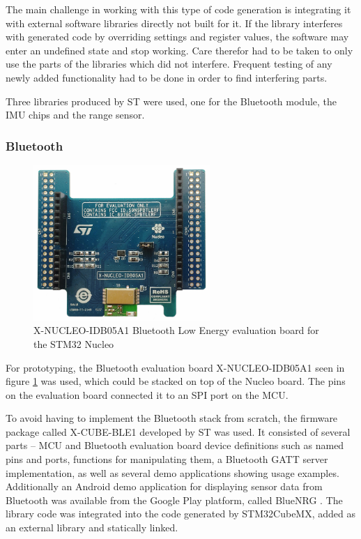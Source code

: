 The main challenge in working with this type of code generation is integrating it with external software libraries directly not built for it. If the library interferes with generated code by overriding settings and register values, the software may enter an undefined state and stop working. Care therefor had to be taken to only use the parts of the libraries which did not interfere. Frequent testing of any newly added functionality had to be done in order to find interfering parts.

Three libraries produced by ST were used, one for the Bluetooth module, the IMU chips and the range sensor.

\subsubsection{Bluetooth}
\label{bluetooth}

\begin{figure}[H]
\centering
\includegraphics[width=0.6\textwidth]{Figures/x-nucleo-idb05a1.jpg}
\caption{X-NUCLEO-IDB05A1 Bluetooth Low Energy evaluation board for the STM32 Nucleo}
\label{bt-eval-board}
\end{figure}

For prototyping, the Bluetooth evaluation board X-NUCLEO-IDB05A1 \cite{x-nucleo-idb05a1} seen in figure \ref{bt-eval-board} was used, which could be stacked on top of the Nucleo board. The pins on the evaluation board connected it to an SPI port on the MCU.

To avoid having to implement the Bluetooth stack from scratch, the firmware package called X-CUBE-BLE1 \cite{x-cube-ble1} developed by ST was used. It consisted of several parts -- MCU and Bluetooth evaluation board device definitions such as named pins and ports, functions for manipulating them, a Bluetooth GATT server implementation, as well as several demo applications showing usage examples. Additionally an Android demo application for displaying sensor data from Bluetooth was available from the Google Play platform, called BlueNRG \cite{bluenrg-app}. The library code was integrated into the code generated by STM32CubeMX, added as an external library and statically linked.

